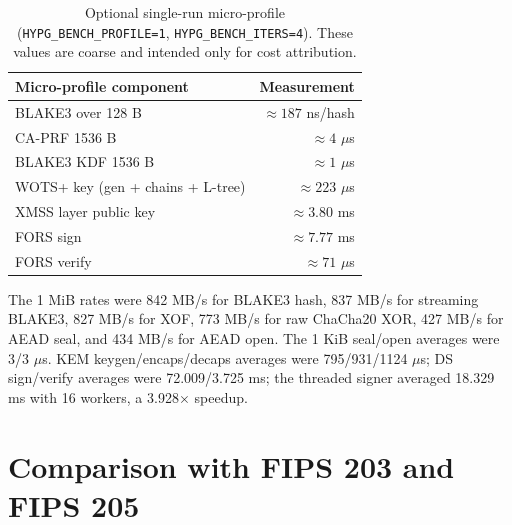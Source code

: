 \documentclass[runningheads]{llncs}
\begin{document}
\begin{table}[t]
\centering
\small
\begin{tabular}{@{}lr@{}}
\toprule
Micro-profile component & Measurement \\
\midrule
BLAKE3 over 128 B & $\approx187$ ns/hash \\
CA-PRF 1536 B & $\approx4$ $\mu$s \\
BLAKE3 KDF 1536 B & $\approx1$ $\mu$s \\
WOTS+ key (gen + chains + L-tree) & $\approx223$ $\mu$s \\
XMSS layer public key & $\approx3.80$ ms \\
FORS sign & $\approx7.77$ ms \\
FORS verify & $\approx71$ $\mu$s \\
\bottomrule
\end{tabular}
\caption{Optional single-run micro-profile
(\texttt{HYPG\_BENCH\_PROFILE=1}, \texttt{HYPG\_BENCH\_ITERS=4}).
These values are coarse and intended only for cost attribution.}
\label{tab:profile}
\end{table}

The 1 MiB rates were 842 MB/s for BLAKE3 hash, 837 MB/s for streaming
BLAKE3, 827 MB/s for XOF, 773 MB/s for raw ChaCha20 XOR, 427 MB/s for
AEAD seal, and 434 MB/s for AEAD open.  The 1 KiB seal/open averages
were 3/3 $\mu$s.  KEM keygen/encaps/decaps averages were
795/931/1124 $\mu$s; DS sign/verify averages were 72.009/3.725 ms; the
threaded signer averaged 18.329 ms with 16 workers, a 3.928$\times$
speedup.

\section{Comparison with FIPS 203 and FIPS 205}
\label{app:fips}
\end{document}

